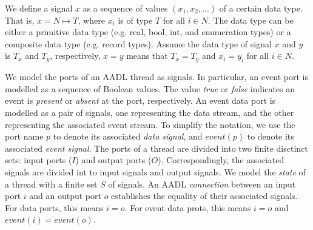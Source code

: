 
We define a signal $x$ as a sequence of values $(x_1, x_2, ...)$ of a certain data type. That is, $x = N \mapsto T$, where $x_i$ is of type $T$ for all $i \in N$. The data type can be either a primitive data type (e.g. real, bool, int, and enumeration types) or a composite data type (e.g. record types). Assume the data type of signal $x$ and $y$ is $T_x$ and $T_y$, respectively, $x = y$ means that $T_x=T_y$ and $x_i = y_i$ for all $i \in N$. 

We model the ports of an AADL thread as signals. In particular, an event port is modelled as a sequence of Boolean values. The value \emph{true} or \emph{false} indicates an event is \emph{present} or \emph{absent} at the port, respectively. An event data port is modelled as a pair of signals, one representing the data stream, and the other representing the associated event stream. To simplify the notation, we use the port name $p$ to denote its associated \emph{data signal}, and $event(p)$ to denote its associated \emph{event signal}. The ports of a thread are divided into two finite disctinct sets: input ports ($I$) and output ports ($O$). Correspondingly, the associated signals are divided int to input signals and output signals. We model the \emph{state} of a thread with a finite set $S$ of signals. %
An AADL \emph{connection} between an input port $i$ and an output port $o$ establishes the equality of their associated signals. For data ports, this means $i = o$. For event data prots, this means $i = o$ and $event(i) = event(o)$. %

